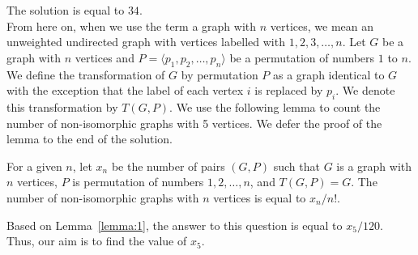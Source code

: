 \begin{solution}
The solution is equal to $34$.\\[0.2cm]

From here on, when we use the term a graph with $n$ vertices, we mean an unweighted undirected graph with vertices labelled with $1, 2, 3, \ldots, n$. Let $G$ be a graph with $n$ vertices and $P = \langle p_1, p_2, \ldots, p_n \rangle$ be a permutation of numbers $1$ to $n$. We define the transformation of $G$ by permutation $P$ as a graph identical to $G$ with the exception that the label of each vertex $i$ is replaced by $p_i$. We denote this transformation by $T(G, P)$.
We use the following lemma to count the number of non-isomorphic graphs with 5 vertices. We defer the proof of the lemma to the end of the solution.
\begin{lemma}\label{lemma:1}
	For a given $n$, let $x_n$ be the number of pairs $(G, P)$ such that $G$ is a graph with $n$ vertices, $P$ is  permutation of numbers $1,2, \ldots, n$, and $T(G, P) = G$. The number of non-isomorphic graphs with $n$ vertices is equal to $x_n/n!$.
\end{lemma}


Based on Lemma~\ref{lemma:1}, the answer to this question is equal to $x_5 / 120$. Thus, our aim is to find the value of $x_5$.\\[0.2cm]


\end{solution}

